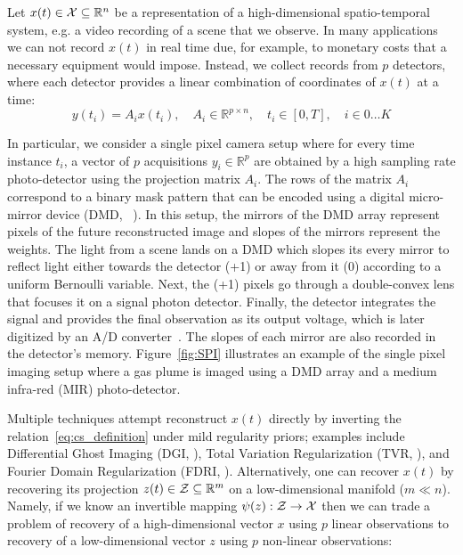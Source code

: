 Let $x(t) \in \operatorname{\mathcal{X}} \subseteq \mathbb{R}^n$ be a representation of a high-dimensional spatio-temporal system, e.g. a video recording of a scene that we observe. In many applications we can not record $x(t)$ in real time due, for example, to monetary costs that a necessary equipment would impose. Instead, we collect records from $p$ detectors, where each detector provides a linear combination of coordinates of $x(t)$ at a time:
\begin{equation}
    \label{eq:cs_definition}
    y(t_i) = A_i x(t_i), \quad A_i \in \mathbb{R}^{p\times n}, \quad t_i \in [0, T],\quad i \in 0 \dots K
\end{equation}

In particular, we consider a single pixel camera setup where for every time instance $t_i$, a vector of $p$ acquisitions $y_i \in \mathbb{R}^p$ are obtained by a high sampling rate photo-detector using the projection matrix $A_i$. The rows of the matrix $A_i$ correspond to a binary mask pattern that can be encoded using a digital micro-mirror device (DMD, ~\citep{pittman1995optical, sampsell1993overview}). In this setup, the mirrors of the DMD array represent pixels of the future reconstructed image and slopes of the mirrors represent the weights. The light from a scene lands on a DMD which slopes its every mirror to reflect light either towards the detector (+1) or away from it (0) according to a uniform Bernoulli variable. Next, the (+1) pixels go through a double-convex lens that focuses it on a signal photon detector. Finally, the detector integrates the signal and provides the final observation as its output voltage, which is later digitized by an A/D converter~\citep{duarte2008single}. The slopes of each mirror are also recorded in the detector's memory. Figure~\ref{fig:SPI} illustrates an example of the single pixel imaging setup where a gas plume is imaged using a DMD array and a medium infra-red (MIR) photo-detector. 

Multiple techniques attempt reconstruct $x(t)$ directly by inverting the relation~\ref{eq:cs_definition} under mild regularity priors; examples include Differential Ghost Imaging (DGI, \citep{ferri2010differential}), Total Variation Regularization (TVR, \citep{bian2018experimental}), and Fourier Domain Regularization (FDRI, \citep{pastuszczak2021differential}).  Alternatively, one can recover $x(t)$ by recovering its projection $z(t) \in \operatorname{\mathcal{Z}} \subseteq \mathbb{R}^m$ on a low-dimensional manifold ($m \ll n$). Namely, if we know  an invertible mapping $\psi(z): \operatorname{\mathcal{Z}} \to \operatorname{\mathcal{X}}$ then we can trade a problem of recovery of a high-dimensional vector $x$ using $p$ linear observations to recovery of a low-dimensional vector $z$ using $p$ non-linear observations:

